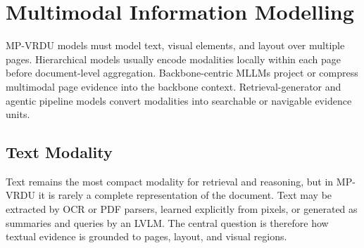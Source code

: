 \documentclass[11pt]{article}
\begin{document}

\section{Multimodal Information Modelling}
MP-VRDU models must model text, visual elements, and layout over multiple pages. Hierarchical models usually encode modalities locally within each page before document-level aggregation. Backbone-centric MLLMs project or compress multimodal page evidence into the backbone context. Retrieval-generator and agentic pipeline models convert modalities into searchable or navigable evidence units.

\subsection{Text Modality}
Text remains the most compact modality for retrieval and reasoning, but in MP-VRDU it is rarely a complete representation of the document. Text may be extracted by OCR or PDF parsers, learned explicitly from pixels, or generated as summaries and queries by an LVLM. The central question is therefore how textual evidence is grounded to pages, layout, and visual regions.
\end{document}
